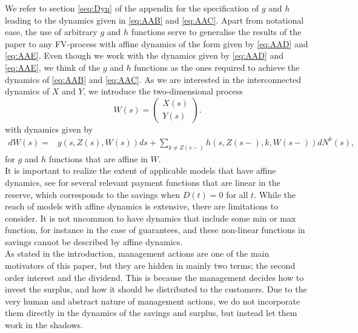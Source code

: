 \documentclass[12pt]{article}
\theoremstyle{my_thm}
\begin{document}
We refer to section \ref{seq:Dyn} of the appendix for the specification of $g$ and $h$ leading to the dynamics given in \eqref{eq:AAB} and \eqref{eq:AAC}. Apart from notational ease, the use of arbitrary $g$ and $h$ functions serve to generalise the results of the paper to any FV-process with affine dynamics of the form given by \eqref{eq:AAD} and \eqref{eq:AAE}. Even though we work with the dynamics given by \eqref{eq:AAD} and \eqref{eq:AAE}, we think of the $g$ and $h$ functions as the ones required to achieve the dynamics of \eqref{eq:AAB} and \eqref{eq:AAC}. As we are interested in the interconnected dynamics of $X$ and $Y$, we introduce the two-dimensional process 
$$
W(s)= \begin{pmatrix}
X(s)\\
Y(s)
\end{pmatrix}.
$$
with dynamics given by
\begin{align*}
dW(s)=& g(s,Z(s),W(s)) ds+ \sum_{k\neq Z(s-)} h(s,Z(s-),k,W(s-)) dN^k(s),
\end{align*}
for $g$ and $h$ functions that are affine in $W$.
\\[12pt]
It is important to realize the extent of applicable models that have affine dynamics, see \citet{Christiansen} for several relevant payment functions that are linear in the reserve, which corresponds to the savings when $D(t)=0$ for all $t$. While the reach of models with affine dynamics is extensive, there are limitations to consider. It is not uncommon to have dynamics that include some min or max function, for instance in the case of guarantees, and these non-linear functions in savings cannot be described by affine dynamics. \\
As stated in the introduction, management actions are one of the main motivators of this paper, but they are hidden in mainly two terms; the second order interest and the dividend. This is because the management decides how to invest the surplus, and how it should be distributed to the customers. Due to the very human and abstract nature of management actions, we do not incorporate them directly in the dynamics of the savings and surplus, but instead let them work in the shadows.
\end{document}

